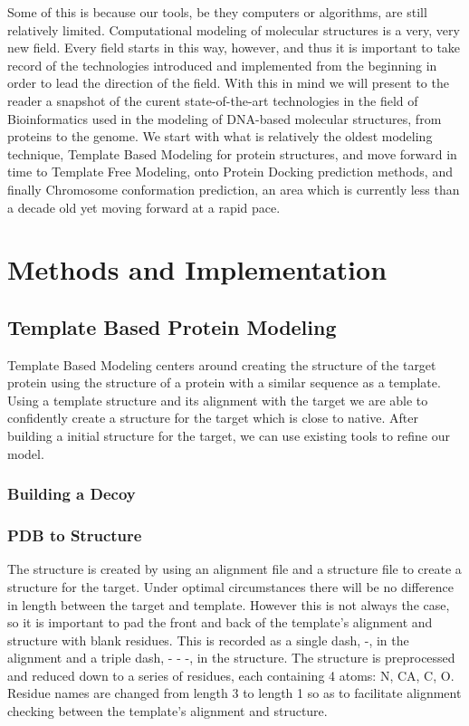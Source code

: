 \documentclass{article}
\begin{document}
Some of this is because our tools, be they computers or algorithms, are still relatively limited.  Computational modeling of molecular structures is a very, very new field.  Every field starts in this way, however, and thus it is important to take record of the technologies introduced and implemented from the beginning in order to lead the direction of the field. With this in mind we will present to the reader a snapshot of the curent state-of-the-art technologies in the field of Bioinformatics used in the modeling of DNA-based molecular structures, from proteins to the genome. We start with what is relatively the oldest modeling technique, Template Based Modeling for protein structures, and move forward in time to Template Free Modeling, onto Protein Docking prediction methods, and finally Chromosome conformation prediction, an area which is currently less than a decade old yet moving forward at a rapid pace.


\section{Methods and Implementation}

\subsection{Template Based Protein Modeling}

Template Based Modeling centers around creating the structure of the target protein using the structure of a protein with a similar sequence as a template. Using a template structure and its alignment with the target we are able to confidently create a structure for the target which is close to native. After building a initial structure for the target, we can use existing tools to refine our model.

\subsubsection{Building a Decoy}

\subsubsection*{PDB to Structure}

The structure is created by using an alignment file and a structure file to create a structure for the target. Under optimal circumstances there will be no difference in length between the target and template. However this is not always the case, so it is important to pad the front and back of the template's alignment and structure with blank residues. This is recorded as a single dash, -, in the alignment and a triple dash, - - -, in the structure. The structure is preprocessed and reduced down to a series of residues, each containing 4 atoms: N, CA, C, O. Residue names are changed from length 3 to length 1 so as to facilitate alignment checking between the template's alignment and structure.
\end{document}
